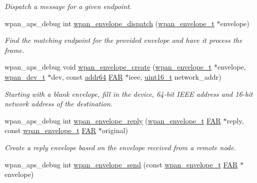 \begin{DoxyCompactItemize}
\begin{DoxyCompactList}\small\item\em Dispatch a message for a given endpoint. \end{DoxyCompactList}\item 
wpan\-\_\-aps\-\_\-debug int \hyperlink{group__wpan__aps_gae84eafd10f51de6cdac4732b8948606d}{wpan\-\_\-envelope\-\_\-dispatch} (\hyperlink{structwpan__envelope__t}{wpan\-\_\-envelope\-\_\-t} $\ast$envelope)
\begin{DoxyCompactList}\small\item\em Find the matching endpoint for the provided {\ttfamily envelope} and have it process the frame. \end{DoxyCompactList}\item 
wpan\-\_\-aps\-\_\-debug void \hyperlink{group__wpan__aps_ga95e2bb4e4c546191c059f54179064fc3}{wpan\-\_\-envelope\-\_\-create} (\hyperlink{structwpan__envelope__t}{wpan\-\_\-envelope\-\_\-t} $\ast$envelope, \hyperlink{structwpan__dev__t}{wpan\-\_\-dev\-\_\-t} $\ast$dev, const \hyperlink{unionaddr64}{addr64} \hyperlink{group__hal_gaef060b3456fdcc093a7210a762d5f2ed}{F\-A\-R} $\ast$ieee, \hyperlink{group__hal_ga5a8b2dc9e45a9ee81a94ef304fb62505}{uint16\-\_\-t} network\-\_\-addr)
\begin{DoxyCompactList}\small\item\em Starting with a blank envelope, fill in the device, 64-\/bit I\-E\-E\-E address and 16-\/bit network address of the destination. \end{DoxyCompactList}\item 
wpan\-\_\-aps\-\_\-debug int \hyperlink{group__wpan__aps_gaaaee02ff456d4f6103a5e94c2ba106c5}{wpan\-\_\-envelope\-\_\-reply} (\hyperlink{structwpan__envelope__t}{wpan\-\_\-envelope\-\_\-t} \hyperlink{group__hal_gaef060b3456fdcc093a7210a762d5f2ed}{F\-A\-R} $\ast$reply, const \hyperlink{structwpan__envelope__t}{wpan\-\_\-envelope\-\_\-t} \hyperlink{group__hal_gaef060b3456fdcc093a7210a762d5f2ed}{F\-A\-R} $\ast$original)
\begin{DoxyCompactList}\small\item\em Create a reply envelope based on the envelope received from a remote node. \end{DoxyCompactList}\item 
wpan\-\_\-aps\-\_\-debug int \hyperlink{group__wpan__aps_ga06f1e9e86b74ef807ded44b79b13e283}{wpan\-\_\-envelope\-\_\-send} (const \hyperlink{structwpan__envelope__t}{wpan\-\_\-envelope\-\_\-t} \hyperlink{group__hal_gaef060b3456fdcc093a7210a762d5f2ed}{F\-A\-R} $\ast$envelope)

\end{DoxyCompactItemize}
